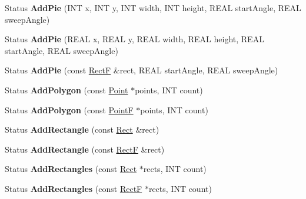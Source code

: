 \begin{DoxyCompactItemize}
\item 
\mbox{\label{class_graphics_path_a88ac1dcbc4ad90c216c6254f831fcaa7}} 
Status {\bfseries Add\+Pie} (I\+NT x, I\+NT y, I\+NT width, I\+NT height, R\+E\+AL start\+Angle, R\+E\+AL sweep\+Angle)
\item 
\mbox{\label{class_graphics_path_ab39aa55b8e463c6fc0297983385cdd38}} 
Status {\bfseries Add\+Pie} (R\+E\+AL x, R\+E\+AL y, R\+E\+AL width, R\+E\+AL height, R\+E\+AL start\+Angle, R\+E\+AL sweep\+Angle)
\item 
\mbox{\label{class_graphics_path_a3a6e08348048bf22a1677f3a29adb152}} 
Status {\bfseries Add\+Pie} (const \hyperlink{struct_rect_f}{RectF} \&rect, R\+E\+AL start\+Angle, R\+E\+AL sweep\+Angle)
\item 
\mbox{\label{class_graphics_path_aee2df7219495c20b271006d040d7c670}} 
Status {\bfseries Add\+Polygon} (const \hyperlink{struct_point}{Point} $\ast$points, I\+NT count)
\item 
\mbox{\label{class_graphics_path_a391afd6f2ed1a3b191fb2de81794c10a}} 
Status {\bfseries Add\+Polygon} (const \hyperlink{struct_point_f}{PointF} $\ast$points, I\+NT count)
\item 
\mbox{\label{class_graphics_path_aa687c54d089d5efd6ce5650ee030f560}} 
Status {\bfseries Add\+Rectangle} (const \hyperlink{struct_rect}{Rect} \&rect)
\item 
\mbox{\label{class_graphics_path_a3f43c70297d9092b54f2c3d08d7c692e}} 
Status {\bfseries Add\+Rectangle} (const \hyperlink{struct_rect_f}{RectF} \&rect)
\item 
\mbox{\label{class_graphics_path_a44b43c5dd7488378701ef7c440b7f474}} 
Status {\bfseries Add\+Rectangles} (const \hyperlink{struct_rect}{Rect} $\ast$rects, I\+NT count)
\item 
\mbox{\label{class_graphics_path_a8507ee7be805e8f4ce0f618b3f17716a}} 
Status {\bfseries Add\+Rectangles} (const \hyperlink{struct_rect_f}{RectF} $\ast$rects, I\+NT count)
\item 

\end{DoxyCompactItemize}
